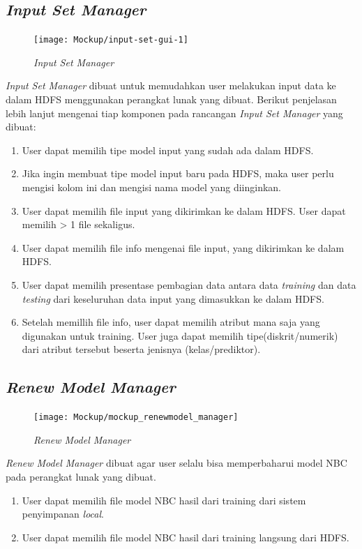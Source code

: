 \subsection{\textit{Input Set Manager}}
\label{subsec:Input Set Manager}

\begin{figure}[H]
	\centering
	\texttt{[image: Mockup/input-set-gui-1]}
	\caption[\textit{Input Set Manager}]{\textit{Input Set Manager}}
	\label{fig:Input Set Manager}
\end{figure}
\textit{Input Set Manager} dibuat untuk memudahkan user melakukan input data ke dalam HDFS menggunakan perangkat lunak yang dibuat. Berikut penjelasan lebih lanjut mengenai tiap komponen pada rancangan \textit{Input Set Manager} yang dibuat:
\begin{enumerate}
	\item User dapat memilih tipe model input yang sudah ada dalam HDFS.
	\item Jika ingin membuat tipe model input baru pada HDFS, maka user perlu mengisi kolom ini dan mengisi nama model yang diinginkan.
	\item User dapat memilih file input yang dikirimkan ke dalam HDFS. User dapat memilih > 1 file sekaligus.
	\item User dapat memilih file info mengenai file input, yang dikirimkan ke dalam HDFS.
	\item User dapat memilih presentase pembagian data antara data \textit{training} dan data \textit{testing} dari keseluruhan data input yang dimasukkan ke dalam HDFS.
	\item Setelah memillih file info, user dapat memilih atribut mana saja yang digunakan untuk training. User juga dapat memilih tipe(diskrit/numerik) dari atribut tersebut beserta jenisnya (kelas/prediktor).
\end{enumerate}

\subsection{\textit{Renew Model Manager}}
\label{subsec:Renew Model Manager}

\begin{figure}[H]
	\centering
	\texttt{[image: Mockup/mockup\_renewmodel\_manager]}
	\caption[\textit{Renew Model Manager}]{\textit{Renew Model Manager}}
	\label{fig:Renew Model Manager}
\end{figure}
\textit{Renew Model Manager} dibuat agar user selalu bisa memperbaharui model NBC pada perangkat lunak yang dibuat.
\begin{enumerate}
	\item User dapat memilih file model NBC hasil dari training dari sistem penyimpanan \textit{local}.
	\item User dapat memilih file model NBC hasil dari training langsung dari HDFS.
\end{enumerate}

